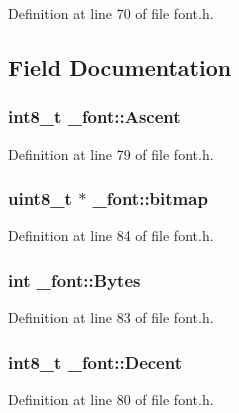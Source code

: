 Definition at line 70 of file font.\-h.



\subsection{Field Documentation}
\hypertarget{struct__font_a998e54724f56879aa85c5ec169873f39}{
\subsubsection[{Ascent}]{\setlength{\rightskip}{0pt plus 5cm}int8\-\_\-t \-\_\-font\-::\-Ascent}}\label{struct__font_a998e54724f56879aa85c5ec169873f39}


Definition at line 79 of file font.\-h.

\hypertarget{struct__font_a336f543c3fe3d3197c6e709fa7df0f5b}{
\subsubsection[{bitmap}]{\setlength{\rightskip}{0pt plus 5cm}uint8\-\_\-t $\ast$ \-\_\-font\-::bitmap}}\label{struct__font_a336f543c3fe3d3197c6e709fa7df0f5b}


Definition at line 84 of file font.\-h.

\hypertarget{struct__font_a13b0b0e4e91f4d663ba4c3c11bfbda8a}{
\subsubsection[{Bytes}]{\setlength{\rightskip}{0pt plus 5cm}int \-\_\-font\-::\-Bytes}}\label{struct__font_a13b0b0e4e91f4d663ba4c3c11bfbda8a}


Definition at line 83 of file font.\-h.

\hypertarget{struct__font_a7f3567884a6aa454b7414b10dba35755}{
\subsubsection[{Decent}]{\setlength{\rightskip}{0pt plus 5cm}int8\-\_\-t \-\_\-font\-::\-Decent}}\label{struct__font_a7f3567884a6aa454b7414b10dba35755}


Definition at line 80 of file font.\-h.

